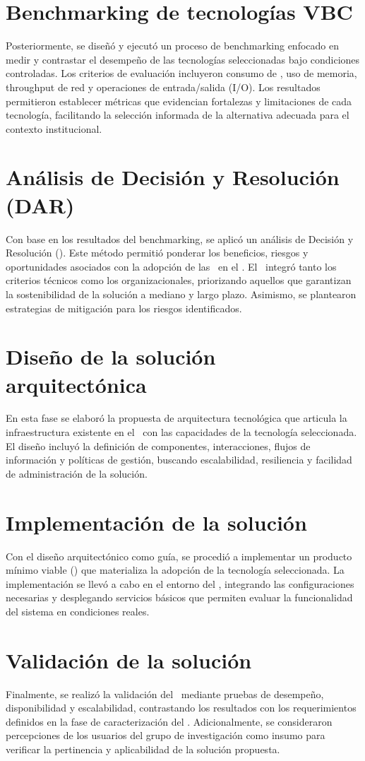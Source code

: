 \section{Benchmarking de tecnologías VBC}
Posteriormente, se diseñó y ejecutó un proceso de benchmarking enfocado en medir y contrastar el desempeño de las tecnologías seleccionadas bajo condiciones controladas. Los criterios de evaluación incluyeron consumo de \CPU, uso de memoria, throughput de red y operaciones de entrada/salida (I/O). Los resultados permitieron establecer métricas que evidencian fortalezas y limitaciones de cada tecnología, facilitando la selección informada de la alternativa adecuada para el contexto institucional.

\section{Análisis de Decisión y Resolución (DAR)}
Con base en los resultados del benchmarking, se aplicó un análisis de Decisión y Resolución (\DAR). Este método permitió ponderar los beneficios, riesgos y oportunidades asociados con la adopción de las \VBC\ en el \GRID. El \DAR\ integró tanto los criterios técnicos como los organizacionales, priorizando aquellos que garantizan la sostenibilidad de la solución a mediano y largo plazo. Asimismo, se plantearon estrategias de mitigación para los riesgos identificados.

\section{Diseño de la solución arquitectónica}
En esta fase se elaboró la propuesta de arquitectura tecnológica que articula la infraestructura existente en el \GRID\ con las capacidades de la tecnología seleccionada. El diseño incluyó la definición de componentes, interacciones, flujos de información y políticas de gestión, buscando escalabilidad, resiliencia y facilidad de administración de la solución.

\section{Implementación de la solución}
Con el diseño arquitectónico como guía, se procedió a implementar un producto mínimo viable (\PMV) que materializa la adopción de la tecnología seleccionada. La implementación se llevó a cabo en el entorno del \GRID, integrando las configuraciones necesarias y desplegando servicios básicos que permiten evaluar la funcionalidad del sistema en condiciones reales.

\section{Validación de la solución}
Finalmente, se realizó la validación del \PMV\ mediante pruebas de desempeño, disponibilidad y escalabilidad, contrastando los resultados con los requerimientos definidos en la fase de caracterización del \GRID. Adicionalmente, se consideraron percepciones de los usuarios del grupo de investigación como insumo para verificar la pertinencia y aplicabilidad de la solución propuesta.
